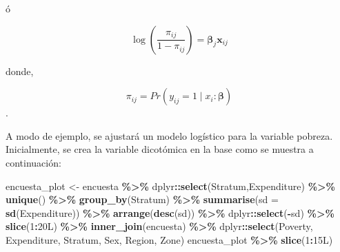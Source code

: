 \documentclass[
  spanish,
  12pt,
]{book}
\newenvironment{Shaded}{\begin{snugshade}}{\end{snugshade}}
\newcommand{\AttributeTok}[1]{\textcolor[rgb]{0.13,0.29,0.53}{#1}}
\newcommand{\DataTypeTok}[1]{\textcolor[rgb]{0.13,0.29,0.53}{#1}}
\newcommand{\DecValTok}[1]{\textcolor[rgb]{0.00,0.00,0.81}{#1}}
\newcommand{\FunctionTok}[1]{\textcolor[rgb]{0.13,0.29,0.53}{\textbf{#1}}}
\newcommand{\NormalTok}[1]{#1}
\newcommand{\OtherTok}[1]{\textcolor[rgb]{0.56,0.35,0.01}{#1}}
\newcommand{\SpecialCharTok}[1]{\textcolor[rgb]{0.81,0.36,0.00}{\textbf{#1}}}
\begin{document}
ó

\[
\log\left(\frac{\pi_{ij}}{1-\pi_{ij}}\right)=\boldsymbol{\beta}_{j}\boldsymbol{x}_{ij}
\]

donde,

\[
\pi_{ij}=Pr\left(y_{ij}=1\mid x_{i}:\boldsymbol{\beta}\right)
\].

A modo de ejemplo, se ajustará un modelo logístico para la variable pobreza. Inicialmente, se crea la variable dicotómica en la base como se muestra a continuación:

\begin{Shaded}
\begin{Highlighting}[]
\NormalTok{encuesta\_plot }\OtherTok{\textless{}{-}}\NormalTok{ encuesta }\SpecialCharTok{\%\textgreater{}\%}
\NormalTok{  dplyr}\SpecialCharTok{::}\FunctionTok{select}\NormalTok{(Stratum,Expenditure) }\SpecialCharTok{\%\textgreater{}\%} \FunctionTok{unique}\NormalTok{() }\SpecialCharTok{\%\textgreater{}\%}
  \FunctionTok{group\_by}\NormalTok{(Stratum)  }\SpecialCharTok{\%\textgreater{}\%} 
  \FunctionTok{summarise}\NormalTok{(}\AttributeTok{sd =} \FunctionTok{sd}\NormalTok{(Expenditure)) }\SpecialCharTok{\%\textgreater{}\%} 
  \FunctionTok{arrange}\NormalTok{(}\FunctionTok{desc}\NormalTok{(sd)) }\SpecialCharTok{\%\textgreater{}\%}\NormalTok{ dplyr}\SpecialCharTok{::}\FunctionTok{select}\NormalTok{(}\SpecialCharTok{{-}}\NormalTok{sd) }\SpecialCharTok{\%\textgreater{}\%} 
  \FunctionTok{slice}\NormalTok{(}\DecValTok{1}\SpecialCharTok{:}\DecValTok{20}\DataTypeTok{L}\NormalTok{) }\SpecialCharTok{\%\textgreater{}\%}
  \FunctionTok{inner\_join}\NormalTok{(encuesta) }\SpecialCharTok{\%\textgreater{}\%}  
\NormalTok{  dplyr}\SpecialCharTok{::}\FunctionTok{select}\NormalTok{(Poverty, Expenditure, Stratum, }
\NormalTok{         Sex, Region, Zone) }
\NormalTok{encuesta\_plot }\SpecialCharTok{\%\textgreater{}\%} \FunctionTok{slice}\NormalTok{(}\DecValTok{1}\SpecialCharTok{:}\DecValTok{15}\DataTypeTok{L}\NormalTok{)}
\end{Highlighting}
\end{Shaded}
\end{document}
